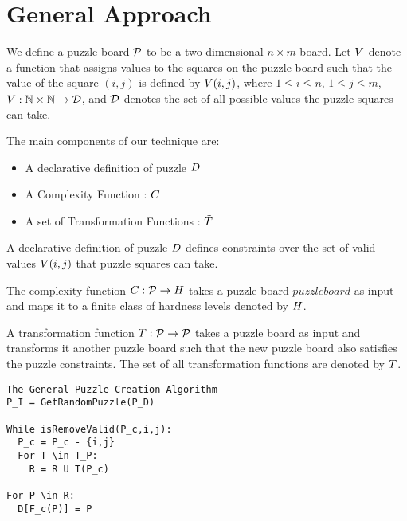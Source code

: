 
\section{General Approach}

\begin{definition}
We define a puzzle board $\mathcal{P}$ to be a two dimensional $n
\times m$ board. Let $V$ denote a function that assigns
values to the squares on the puzzle board such that the value of the
square $(i,j)$ is defined by $V(i,j)$, where $1 \leq i \leq
n$, $1 \leq j \leq m$, $V: \mathbb{N} \times \mathbb{N} \rightarrow
\mathcal{D}$, and $\mathcal{D}$ denotes the set of all possible
values the puzzle squares can take.
\end{definition}

The main components of our technique are:
\begin{itemize}
\item{A declarative definition of puzzle $D$}
\item{A Complexity Function : $C$}
\item{A set of Transformation Functions : $\tilde{T}$}
\end{itemize}

\begin{definition}
A declarative definition of puzzle $D$ defines constraints over the set of valid values $V(i,j)$ that puzzle squares can take.
\end{definition}

\begin{definition}
The complexity function $C : \mathcal{P} \rightarrow
H$ takes a puzzle board $puzzleboard$ as input and maps
it to a finite class of hardness levels denoted by $H$.
\end{definition}

\begin{definition}
A transformation function $T : \mathcal{P} \rightarrow \mathcal{P}$ takes a puzzle board as input and transforms it another puzzle board such that the new puzzle board also satisfies the puzzle constraints. The set of all transformation functions are denoted by $\tilde{T}$.
\end{definition}

\begin{verbatim}
The General Puzzle Creation Algorithm
P_I = GetRandomPuzzle(P_D)

While isRemoveValid(P_c,i,j):
  P_c = P_c - {i,j}
  For T \in T_P:
    R = R U T(P_c)

For P \in R:
  D[F_c(P)] = P
\end{verbatim}

